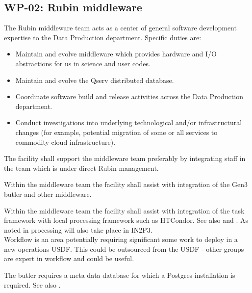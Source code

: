 \subsection{\textbf{WP-02}: Rubin \gls{middleware} }
\label{sect:wp02}
The Rubin \gls{middleware} team acts as a center of general software development expertise to the Data Production department. Specific duties are:
\begin{itemize}
	\item Maintain and evolve \gls{middleware} which provides hardware and I/O abstractions for us in science and user codes.
	\item Maintain and evolve the \gls{Qserv} distributed database.
	\item Coordinate software build and release activities across the Data Production department.
	\item Conduct investigations into underlying technological and/or infrastructural changes (for example, potential migration of some or all services to commodity cloud infrastructure).
\end{itemize}

\reqsimp{}{}{}{}{}
{
The facility shall support the \gls{middleware} team preferably by integrating staff in the team which is
under direct Rubin management.
}

\reqsimp{}{}{}{}{}
{
Within the middleware team the facility shall assist with integration of the Gen3 butler and other middleware.
}

\reqsimp{}{}{}{}{}
{
Within the middleware team the facility shall assist with integration of the task framework with local processing framework such as HTCondor. See also   and . As noted in  processing will also take place in IN2P3.
}\\
Workflow is an area potentially requiring significant some work to deploy in a new operations \gls{USDF}. This could be outsourced from the \gls{USDF} -
other groups are expert in workflow and could be useful.

\reqsimp{}{}{}{}{}
{
	The butler requires a meta data database for which a Postgres installation is required. See also . \label{req:butler}
}
